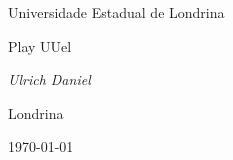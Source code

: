 \begin{titlepage}
  \centering
  \vspace*{2cm}
  {\Large Universidade Estadual de Londrina \par}
  \vspace{3cm}
  {\Huge Play UUel \par}
  \vspace{2cm}
  {\Large\itshape Ulrich Daniel \par}
  \vfill
  {\large Londrina \par}
  {\Large \today \par}
\end{titlepage}
